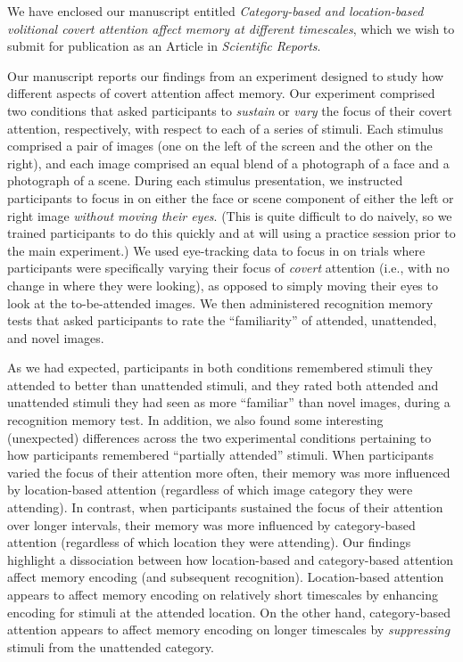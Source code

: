 \documentclass[10pt,stdletter,orderfromtodate,sigleft]{newlfm}
\begin{document}
\begin{newlfm}

We have enclosed our manuscript entitled \textit{Category-based and
location-based volitional covert attention affect memory at different
timescales}, which we wish to submit for publication as an Article in
\textit{Scientific Reports}.

Our manuscript reports our findings from an experiment designed to study how
different aspects of covert attention affect memory. Our experiment comprised
two conditions that asked participants to \textit{sustain} or \textit{vary} the
focus of their covert attention, respectively, with respect to each of a series
of stimuli. Each stimulus comprised a pair of images (one on the left of the
screen and the other on the right), and each image comprised an equal blend of
a photograph of a face and a photograph of a scene. During each stimulus
presentation, we instructed participants to focus in on either the face or
scene component of either the left or right image \textit{without moving their
eyes}. (This is quite difficult to do naively, so we trained participants to do
this quickly and at will using a practice session prior to the main
experiment.) We used eye-tracking data to focus in on trials where participants
were specifically varying their focus of \textit{covert} attention (i.e., with
no change in where they were looking), as opposed to simply moving their eyes
to look at the to-be-attended images. We then administered recognition memory
tests that asked participants to rate the ``familiarity'' of attended,
unattended, and novel images.

As we had expected, participants in both conditions remembered stimuli they
attended to better than unattended stimuli, and they rated both attended and
unattended stimuli they had seen as more ``familiar'' than novel images, during
a recognition memory test. In addition, we also found some interesting
(unexpected) differences across the two experimental conditions pertaining to how
participants remembered ``partially attended'' stimuli. When participants
varied the focus of their attention more often, their memory was more
influenced by location-based attention (regardless of which image category they
were attending). In contrast, when participants sustained the focus of their
attention over longer intervals, their memory was more influenced by
category-based attention (regardless of which location they were attending).
Our findings highlight a dissociation between how location-based and
category-based attention affect memory encoding (and subsequent recognition).
Location-based attention appears to affect memory encoding on relatively short
timescales by enhancing encoding for stimuli at the attended location. On the
other hand, category-based attention appears to affect memory encoding on
longer timescales by \textit{suppressing} stimuli from the unattended category.


\end{newlfm}
\end{document}
